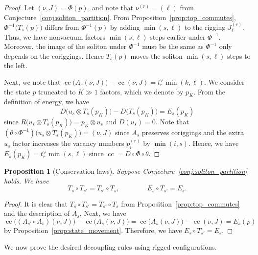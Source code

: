 \documentclass[reqno]{amsart}
\DeclareMathOperator{\cc}{cc} %
\theoremstyle{plain}
\newtheorem{prop}[thm]{Proposition}
\theoremstyle{definition}
\numberwithin{equation}{section}
\begin{document}
\begin{proof}
Let $(\nu, J) = \Phi(p)$, and note that $\nu^{(r)} = (\ell)$ from Conjecture~\ref{conj:soliton_partition}.
From Proposition~\ref{prop:top_commutes}, $\Phi^{-1}\bigl(T_s(p)\bigr)$ differs from $\Phi^{-1}(p)$ by adding $\min(s, \ell)$ to the rigging $J_{\ell}^{(r)}$.
Thus, we have nonvacuum factors $\min(s, \ell)$ steps earlier under $\Phi^{-1}$.
Moreover, the image of the soliton under $\Phi^{-1}$ must be the same as $\Phi^{-1}$ only depends on the coriggings.
Hence $T_s(p)$ moves the soliton $\min(s, \ell)$ steps to the left.

Next, we note that $\cc\bigl(A_s(\nu, J)\bigr) - \cc(\nu, J) = t_r^{\vee} \min(k, \ell)$.
We consider the state $p$ truncated to $K \gg 1$ factors, which we denote by $p_K$.
From the definition of energy, we have
\[
D\bigl(u_s \otimes T_s(p_K)\bigr) - D\bigl(T_s(p_K)\bigr) = E_s(p_K)
\]
since $R\bigl(u_s \otimes T_s(p_K)\bigr) = p_K \otimes u_s$ and $D(u_s) = 0$.
Note that $(\theta \circ \Phi^{-1}) \bigl(u_s \otimes T_s(p_K) \bigr) = (\nu, J)$ since $A_s$ preserves coriggings and the extra $u_s$ factor increases the vacancy numbers $p_i^{(r)}$ by $\min(i, s)$.
Hence, we have $E_s(p_K) = t_r^{\vee} \min(s, \ell)$ since $\cc = D \circ \Phi \circ \theta$.
\end{proof}

\begin{prop}[Conservation laws]
Suppose Conjecture~\ref{conj:soliton_partition} holds.
We have
\[
T_s \circ T_{s'} = T_{s'} \circ T_s,
\qquad\qquad
E_s \circ T_{s'} = E_s.
\]
\end{prop}

\begin{proof}
It is clear that $T_s \circ T_{s'} = T_{s'} \circ T_s$ from Proposition~\ref{prop:top_commutes} and the description of $A_s$.
Next, we have
\[
\cc\bigl((A_{s'} \circ A_s)(\nu, J)\bigr) - \cc\bigl(A_s(\nu, J)\bigr)
= \cc\bigl(A_s(\nu, J)\bigr) - \cc(\nu, J)
= E_s(p)
\]
by Proposition~\ref{prop:state_movement}.
Therefore, we have $E_s \circ T_{s'} = E_s$.
\end{proof}

We now prove the desired decoupling rules using rigged configurations.
\end{document}
